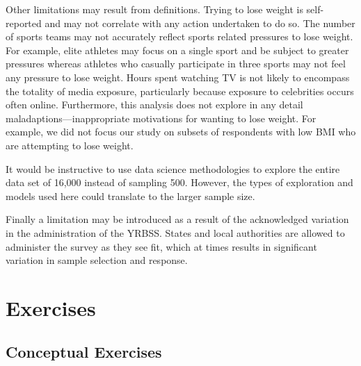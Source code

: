 \documentclass[
]{krantz}
\begin{document}
Other limitations may result from definitions. Trying to lose weight is self-reported and may not correlate with any action undertaken to do so. The number of sports teams may not accurately reflect sports related pressures to lose weight. For example, elite athletes may focus on a single sport and be subject to greater pressures whereas athletes who casually participate in three sports may not feel any pressure to lose weight. Hours spent watching TV is not likely to encompass the totality of media exposure, particularly because exposure to celebrities occurs often online. Furthermore, this analysis does not explore in any detail maladaptions---inappropriate motivations for wanting to lose weight. For example, we did not focus our study on subsets of respondents with low BMI who are attempting to lose weight.

It would be instructive to use data science methodologies to explore the entire data set of 16,000 instead of sampling 500. However, the types of exploration and models used here could translate to the larger sample size.

Finally a limitation may be introduced as a result of the acknowledged variation in the administration of the YRBSS. States and local authorities are allowed to administer the survey as they see fit, which at times results in significant variation in sample selection and response.

\hypertarget{exercises-2}{%
\section{Exercises}\label{exercises-2}}

\hypertarget{conceptual-exercises}{%
\subsection{Conceptual Exercises}\label{conceptual-exercises}}
\end{document}

